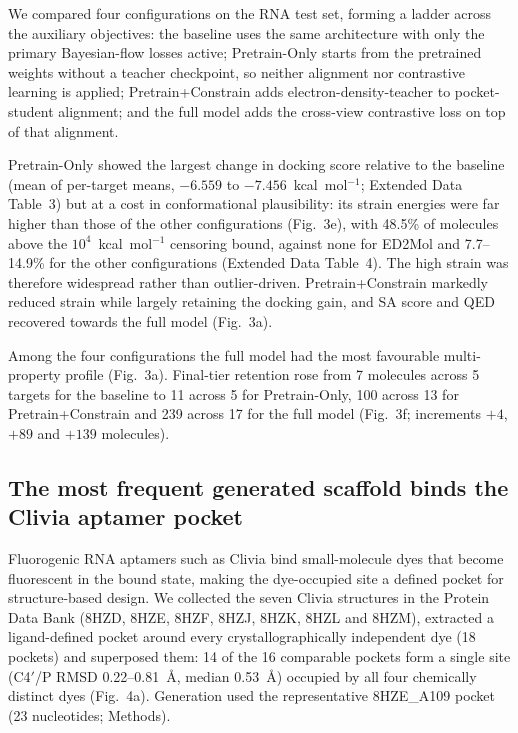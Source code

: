 \documentclass[pdflatex,sn-mathphys-num]{sn-jnl}
\theoremstyle{thmstyleone}
\theoremstyle{thmstyletwo}
\theoremstyle{thmstylethree}
\begin{document}
We compared four configurations on the RNA test set, forming a ladder across the auxiliary objectives: the baseline uses the same architecture with only the primary Bayesian-flow losses active; Pretrain-Only starts from the pretrained weights without a teacher checkpoint, so neither alignment nor contrastive learning is applied; Pretrain+Constrain adds electron-density-teacher to pocket-student alignment; and the full model adds the cross-view contrastive loss on top of that alignment.

Pretrain-Only showed the largest change in docking score relative to the baseline (mean of per-target means, $-6.559$ to $-7.456$~kcal~mol$^{-1}$; Extended Data Table~3) but at a cost in conformational plausibility: its strain energies were far higher than those of the other configurations (Fig.~3e), with 48.5\% of molecules above the $10^{4}$~kcal~mol$^{-1}$ censoring bound, against none for ED2Mol and 7.7--14.9\% for the other configurations (Extended Data Table~4). The high strain was therefore widespread rather than outlier-driven. Pretrain+Constrain markedly reduced strain while largely retaining the docking gain, and SA score and QED recovered towards the full model (Fig.~3a).

Among the four configurations the full model had the most favourable multi-property profile (Fig.~3a). Final-tier retention rose from 7 molecules across 5 targets for the baseline to 11 across 5 for Pretrain-Only, 100 across 13 for Pretrain+Constrain and 239 across 17 for the full model (Fig.~3f; increments $+4$, $+89$ and $+139$ molecules).


\subsection{The most frequent generated scaffold binds the Clivia aptamer pocket}

Fluorogenic RNA aptamers such as Clivia bind small-molecule dyes that become fluorescent in the bound state, making the dye-occupied site a defined pocket for structure-based design. We collected the seven Clivia structures in the Protein Data Bank (8HZD, 8HZE, 8HZF, 8HZJ, 8HZK, 8HZL and 8HZM), extracted a ligand-defined pocket around every crystallographically independent dye (18 pockets) and superposed them: 14 of the 16 comparable pockets form a single site (C4$'$/P RMSD 0.22--0.81~\AA, median 0.53~\AA) occupied by all four chemically distinct dyes (Fig.~4a). Generation used the representative 8HZE\_A109 pocket (23 nucleotides; Methods).
\end{document}
